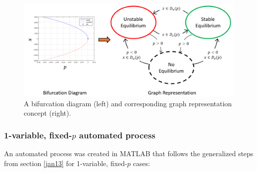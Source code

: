 \documentclass[12pt]{article}
\begin{document}
\begin{figure}[H]
\begin{center}
\includegraphics[width=6in]{jan13_graph_concept.png}
\caption{A bifurcation diagram (left) and corresponding graph representation concept (right).}
\label{jan13_graph_concept}
\end{center}
\end{figure}


\subsubsection{1-variable, fixed-$p$ automated process}
\label{process_1var}
An automated process was created in MATLAB that follows the generalized steps from section \ref{jan13} for 1-variable, fixed-$p$ cases:
\end{document}
